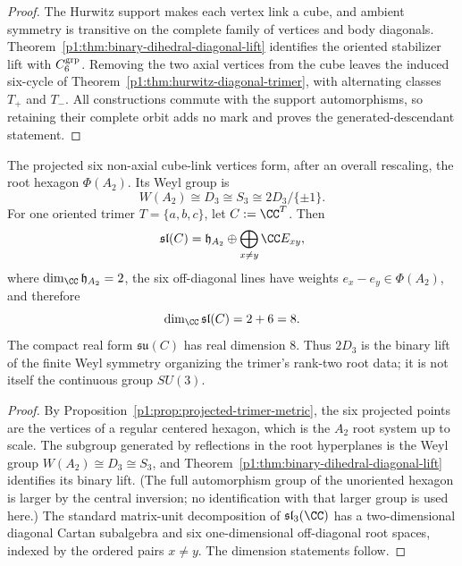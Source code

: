 \documentclass[11pt]{article}
\begin{document}
\begin{proof}
The Hurwitz support makes each vertex link a cube, and ambient symmetry is
transitive on the complete family of vertices and body diagonals.
Theorem~\ref{p1:thm:binary-dihedral-diagonal-lift} identifies the oriented
stabilizer lift with \(C_6^{\rm grp}\).  Removing the two axial vertices from
the cube leaves the induced six-cycle of
Theorem~\ref{p1:thm:hurwitz-diagonal-trimer}, with alternating classes
\(T_+\) and \(T_-\).  All constructions commute with the support
automorphisms, so retaining their complete orbit adds no mark and proves the
generated-descendant statement.
\end{proof}

\begin{theorem}
\label{p1:thm:binary-dihedral-a2-weyl}
The projected six non-axial cube-link vertices form, after an overall rescaling,
the root hexagon \(\Phi(A_2)\).  Its Weyl group is
\[
    W(A_2)\cong D_3\cong S_3
    \cong2D_3/\{\pm1\}.
\]
For one oriented trimer \(T=\{a,b,c\}\), let
\(C:=\CC^T\).  Then
\[
    \mathfrak{sl}(C)
    =\mathfrak h_{A_2}
     \oplus
     \bigoplus_{x\ne y}\CC E_{xy},
\]
where \(\dim_\CC\mathfrak h_{A_2}=2\), the six off-diagonal lines have weights
\(e_x-e_y\in\Phi(A_2)\), and therefore
\[
    \dim_\CC\mathfrak{sl}(C)=2+6=8.
\]
The compact real form \(\mathfrak{su}(C)\) has real dimension \(8\).  Thus
\(2D_3\) is the binary lift of the finite Weyl symmetry organizing the trimer's
rank-two root data; it is not itself the continuous group \(SU(3)\).
\end{theorem}

\begin{proof}
By Proposition~\ref{p1:prop:projected-trimer-metric}, the six projected points
are the vertices of a regular centered hexagon, which is the \(A_2\) root system
up to scale.  The subgroup generated by reflections in the root hyperplanes is
the Weyl group \(W(A_2)\cong D_3\cong S_3\), and
Theorem~\ref{p1:thm:binary-dihedral-diagonal-lift} identifies its binary lift.
(The full automorphism group of the unoriented hexagon is larger by the central
inversion; no identification with that larger group is used here.)  The standard matrix-unit decomposition of
\(\mathfrak{sl}_3(\CC)\) has a two-dimensional diagonal Cartan subalgebra and
six one-dimensional off-diagonal root spaces, indexed by the ordered pairs
\(x\ne y\).  The dimension statements follow.
\end{proof}
\end{document}
